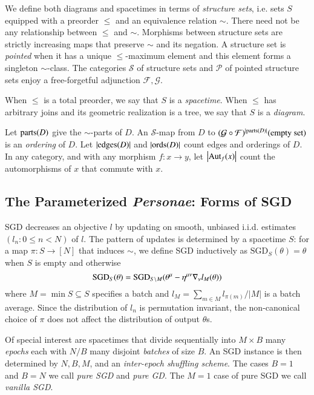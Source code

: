 \documentclass{article}
\theoremstyle{plain}
\theoremstyle{definition}
\newcommand{\Free}{\mathcal{F}}
\newcommand{\Forg}{\mathcal{G}}
\newcommand{\Aut}{\text{\textnormal{Aut}}}
\newcommand{\edges}{\text{\textnormal{edges}}}
\newcommand{\ords}{\text{\textnormal{ords}}}
\newcommand{\parts}{\text{\textnormal{parts}}}
\newcommand{\Pp}{\mathcal{P}}
\newcommand{\Ss}{\mathcal{S}}
\newcommand{\SGD}{\text{\textnormal{SGD}}}
\newcommand{\wabs}[1]{\left|#1\right|}
\begin{document}
        We define both diagrams and spacetimes in terms of \emph{structure
        sets}, i.e. sets $S$ equipped with a preorder $\leq$ and an equivalence
        relation $\sim$.  There need not be any relationship between $\leq$ and
        $\sim$.  Morphisms between structure sets are strictly increasing maps
        that preserve $\sim$ and its negation.  A structure set is
        \emph{pointed} when it has a unique $\leq$-maximum element and this
        element forms a singleton $\sim$-class.  The categories $\Ss$ of
        structure sets and $\Pp$ of pointed structure sets enjoy a
        free-forgetful adjunction $\Free, \Forg$.
        
        When $\leq$ is a total preorder, we say that $S$ is a \emph{spacetime}.
        When $\leq$ has arbitrary joins and its geometric realization is a
        tree, we say that $S$ is a \emph{diagram}. 
        
        Let $\parts(D)$ give the $\sim$-parts of $D$.  An $\Ss$-map from $D$ to
        $
            (\Forg\circ\Free)^{|\parts(D)|}(\text{empty set})
        $
        is an \emph{ordering} of $D$.  Let $|\edges(D)|$ and $|\ords(D)|$ count
        edges and orderings of $D$.  In any category, and with any morphism
        $f: x\to y$, let $\wabs{\Aut_f(x)}$ count the automorphisms of $x$
        that commute with $x$.
    
    \subsection{The Parameterized \emph{Personae}: Forms of SGD}
        SGD decreases an objective $l$ by updating on smooth, unbiased i.i.d.
        estimates $(l_n: 0\leq n<N)$ of $l$.  The pattern of updates is
        determined by a spacetime $S$: for a map
        $\pi:S\to [N]$ that induces $\sim$, we define SGD inductively as
        $\text{SGD}_{S}(\theta) = \theta$ when $S$ is empty and otherwise
        $$
            \SGD_S(\theta)
            =
            \SGD_{S\setminus M}(
                \theta^\mu - \eta^{\mu\nu} \nabla_\nu l_{M}(\theta)
            )
        $$
        where $M = \min S \subseteq S$ specifies a batch and $l_M = \sum_{m\in
        M} l_{\pi(m)} / \wabs{M}$ is a batch average.  Since the distribution
        of $l_n$ is permutation invariant, the non-canonical choice of $\pi$
        does not affect the distribution of output $\theta$s.
    
        Of special interest are spacetimes that divide sequentially into
        $M\times B$ many \emph{epochs} each with $N/B$ many disjoint
        \emph{batches} of size $B$.  An SGD instance is then determined by $N,
        B, M$, and an \emph{inter-epoch shuffling scheme}.  The cases $B=1$ and
        $B=N$ we call \emph{pure SGD} and \emph{pure GD}.  The $M=1$ case of
        pure SGD we call \emph{vanilla SGD}.
\end{document}
